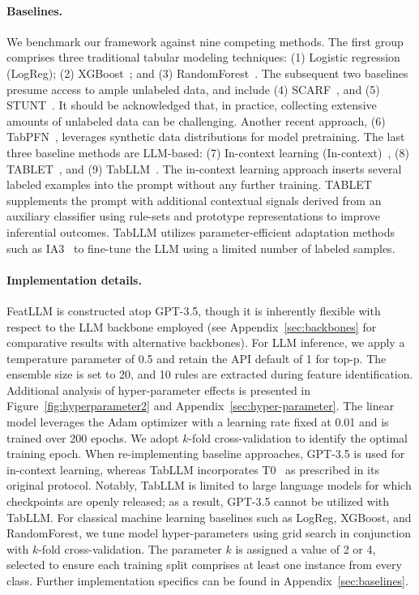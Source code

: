 \vspace*{-0.12in}
\paragraph{Baselines.}
We benchmark our framework against nine competing methods. The first group comprises three traditional tabular modeling techniques: (1) Logistic regression (LogReg); (2) XGBoost~\cite{chen2016xgboost}; and (3) RandomForest~\cite{ho1995random}. The subsequent two baselines presume access to ample unlabeled data, and include (4) SCARF~\cite{bahri2022scarf}, and (5) STUNT~\cite{nam2023stunt}. It should be acknowledged that, in practice, collecting extensive amounts of unlabeled data can be challenging. Another recent approach, (6) TabPFN~\cite{hollmann2022tabpfn}, leverages synthetic data distributions for model pretraining. The last three baseline methods are LLM-based: (7) In-context learning (In-context)~\cite{wei2022emergent}, (8) TABLET~\cite{slack2023tablet}, and (9) TabLLM~\cite{hegselmann2023tabllm}. The in-context learning approach inserts several labeled examples into the prompt without any further training. TABLET supplements the prompt with additional contextual signals derived from an auxiliary classifier using rule-sets and prototype representations to improve inferential outcomes. TabLLM utilizes parameter-efficient adaptation methods such as IA3~\cite{liu2022few} to fine-tune the LLM using a limited number of labeled samples.

\vspace*{-0.12in}
\paragraph{Implementation details.}
\textsf{FeatLLM} is constructed atop GPT-3.5, though it is inherently flexible with respect to the LLM backbone employed (see Appendix~\ref{sec:backbones} for comparative results with alternative backbones). For LLM inference, we apply a temperature parameter of 0.5 and retain the API default of 1 for top-p. The ensemble size is set to 20, and 10 rules are extracted during feature identification. Additional analysis of hyper-parameter effects is presented in Figure~\ref{fig:hyperparameter2} and Appendix~\ref{sec:hyper-parameter}. The linear model leverages the Adam optimizer with a learning rate fixed at 0.01 and is trained over 200 epochs. We adopt $k$-fold cross-validation to identify the optimal training epoch. When re-implementing baseline approaches, GPT-3.5 is used for in-context learning, whereas TabLLM incorporates T0~\cite{sanh2022multitask} as prescribed in its original protocol. Notably, TabLLM is limited to large language models for which checkpoints are openly released; as a result, GPT-3.5 cannot be utilized with TabLLM. For classical machine learning baselines such as LogReg, XGBoost, and RandomForest, we tune model hyper-parameters using grid search in conjunction with $k$-fold cross-validation. The parameter $k$ is assigned a value of 2 or 4, selected to ensure each training split comprises at least one instance from every class. Further implementation specifics can be found in Appendix~\ref{sec:baselines}.

